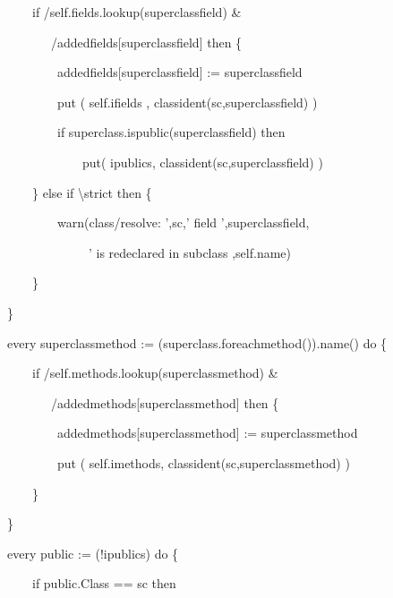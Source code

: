 {\ttfamily\mdseries
\ \ \ \ \ \ \ \ \ \ \ \ if /self.fields.lookup(superclassfield) \&}

{\ttfamily\mdseries
\ \ \ \ \ \ \ \ \ \ \ \ \ \ \ /addedfields[superclassfield] then \{}

{\ttfamily\mdseries
\ \ \ \ \ \ \ \ \ \ \ \ \ \ \ \ addedfields[superclassfield] := superclassfield}

{\ttfamily\mdseries
\ \ \ \ \ \ \ \ \ \ \ \ \ \ \ \ put ( self.ifields , classident(sc,superclassfield) )}

{\ttfamily\mdseries
\ \ \ \ \ \ \ \ \ \ \ \ \ \ \ \ if superclass.ispublic(superclassfield) then}

{\ttfamily\mdseries
\ \ \ \ \ \ \ \ \ \ \ \ \ \ \ \ \ \ \ \ put( ipublics, classident(sc,superclassfield) )}

{\ttfamily\mdseries
\ \ \ \ \ \ \ \ \ \ \ \ \} else if {\textbackslash}strict then \{}

{\ttfamily\mdseries
\ \ \ \ \ \ \ \ \ \ \ \ \ \ \ \ warn({\textquotedbl}class/resolve: '{\textquotedbl},sc,{\textquotedbl}' field
'{\textquotedbl},superclassfield,}

{\ttfamily\mdseries
\ \ \ \ \ \ \ \ \ \ \ \ \ \ \ \ \ \ \ \ \ {\textquotedbl}' is redeclared in subclass {\textquotedbl},self.name)}

{\ttfamily\mdseries
\ \ \ \ \ \ \ \ \ \ \ \ \}}

{\ttfamily\mdseries
\ \ \ \ \ \ \ \ \}}

{\ttfamily\mdseries
\ \ \ \ \ \ \ \ every superclassmethod := (superclass.foreachmethod()).name() do \{}

{\ttfamily\mdseries
\ \ \ \ \ \ \ \ \ \ \ \ if /self.methods.lookup(superclassmethod) \&}

{\ttfamily\mdseries
\ \ \ \ \ \ \ \ \ \ \ \ \ \ \ /addedmethods[superclassmethod] then \{}

{\ttfamily\mdseries
\ \ \ \ \ \ \ \ \ \ \ \ \ \ \ \ addedmethods[superclassmethod] := superclassmethod}

{\ttfamily\mdseries
\ \ \ \ \ \ \ \ \ \ \ \ \ \ \ \ put ( self.imethods, classident(sc,superclassmethod) )}

{\ttfamily\mdseries
\ \ \ \ \ \ \ \ \ \ \ \ \}}

{\ttfamily\mdseries
\ \ \ \ \ \ \ \ \}}

{\ttfamily\mdseries
\ \ \ \ \ \ \ \ every public := (!ipublics) do \{}

{\ttfamily\mdseries
\ \ \ \ \ \ \ \ \ \ \ \ if public.Class == sc then}

